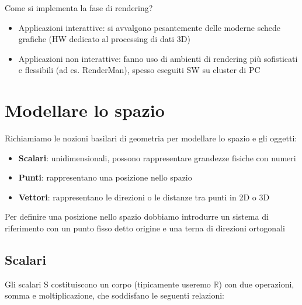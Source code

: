 \documentclass[a4paper, 10pt]{article}
\newcommand{\numberset}{\mathbb}
\newcommand{\R}{\numberset{R}}
\begin{document}
		Come si implementa la fase di rendering?
		\begin{itemize}
			\item Applicazioni interattive: si avvalgono pesantemente delle moderne schede grafiche (HW
				dedicato al processing di dati 3D)
			\item Applicazioni non interattive: fanno uso di ambienti di rendering più sofisticati e flessibili (ad es. RenderMan), spesso eseguiti SW su cluster di PC
		\end{itemize}
		
	\section{Modellare lo spazio}
		Richiamiamo le nozioni basilari di geometria per modellare lo
		spazio e gli oggetti:
		\begin{itemize}
			\item \textbf{Scalari}: unidimensionali, possono rappresentare grandezze fisiche
			con numeri
			\item \textbf{Punti}: rappresentano una posizione nello spazio
			\item \textbf{Vettori}: rappresentano le direzioni o le distanze tra punti in 2D o 3D
		\end{itemize}
		Per definire una posizione nello spazio dobbiamo introdurre un
		sistema di riferimento con un punto fisso detto origine e una
		terna di direzioni ortogonali
		
		\subsection{Scalari}
			Gli scalari S costituiscono un corpo (tipicamente useremo $ \R $)
			con due operazioni, somma e moltiplicazione, che soddisfano
			le seguenti relazioni:
			
\end{document}
